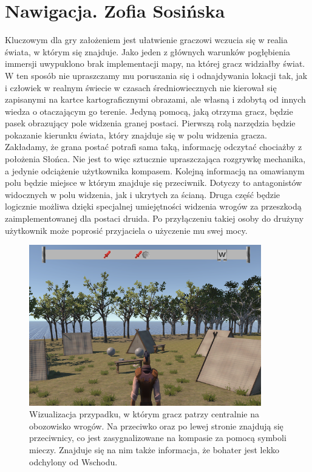 \section{Nawigacja. Zofia Sosińska}\label{chap:naw}

    Kluczowym dla gry założeniem jest ułatwienie graczowi wczucia się w realia świata, w którym się znajduje. Jako jeden z głównych warunków pogłębienia immersji uwypuklono brak implementacji mapy, na której gracz widziałby świat. W ten sposób nie upraszczamy mu poruszania się i odnajdywania lokacji tak, jak i człowiek w realnym świecie w czasach średniowiecznych nie kierował się zapisanymi na kartce kartograficznymi obrazami, ale własną i zdobytą od innych wiedza o otaczającym go terenie. 
    Jedyną pomocą, jaką otrzyma gracz, będzie pasek obrazujący pole widzenia granej postaci. Pierwszą rolą narzędzia będzie pokazanie kierunku świata, który znajduje się w polu widzenia gracza. Zakładamy, że grana postać potrafi sama taką, informację odczytać chociażby z położenia Słońca. Nie jest to więc sztucznie upraszczająca rozgrywkę mechanika, a jedynie odciążenie użytkownika kompasem. 
    Kolejną informacją na omawianym polu będzie miejsce w którym znajduje się przeciwnik. Dotyczy to antagonistów widocznych w polu widzenia, jak i ukrytych za ścianą. Druga część będzie logicznie możliwa dzięki specjalnej umiejętności widzenia wrogów za przeszkodą zaimplementowanej dla postaci druida. Po przyłączeniu takiej osoby do drużyny użytkownik może poprosić przyjaciela o użyczenie mu swej mocy.

\begin{figure}[htbp]
    \centering
    \includegraphics[width=0.9\textwidth]{images/ui/compass.png}
    \caption{Wizualizacja przypadku, w którym gracz patrzy centralnie na obozowisko wrogów. Na przeciwko oraz po lewej stronie znajdują się przeciwnicy, co jest zasygnalizowane na kompasie za pomocą symboli mieczy. Znajduje się na nim także informacja, że bohater jest lekko odchylony od Wschodu.
    }\label{fig:compass}
\end{figure}